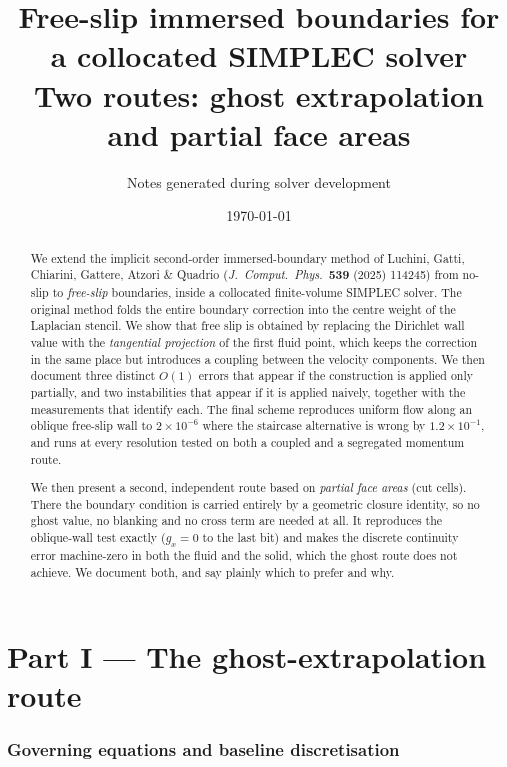 \documentclass[11pt,a4paper]{article}
\title{\bf Free-slip immersed boundaries for a collocated SIMPLEC solver\\
\large Two routes: ghost extrapolation and partial face areas}
\author{Notes generated during solver development}
\date{\today}
\begin{document}
\maketitle

\begin{abstract}
We extend the implicit second-order immersed-boundary method of Luchini, Gatti, Chiarini,
Gattere, Atzori \& Quadrio (\emph{J.\ Comput.\ Phys.}\ \textbf{539} (2025) 114245) from
no-slip to \emph{free-slip} boundaries, inside a collocated finite-volume SIMPLEC solver.
The original method folds the entire boundary correction into the centre weight of the
Laplacian stencil. We show that free slip is obtained by replacing the Dirichlet wall value
with the \emph{tangential projection} of the first fluid point, which keeps the correction in
the same place but introduces a coupling between the velocity components. We then document
three distinct $O(1)$ errors that appear if the construction is applied only partially, and
two instabilities that appear if it is applied naively, together with the measurements that
identify each. The final scheme reproduces uniform flow along an oblique free-slip wall to
$2\times10^{-6}$ where the staircase alternative is wrong by $1.2\times10^{-1}$, and runs at
every resolution tested on both a coupled and a segregated momentum route.

We then present a second, independent route based on \emph{partial face areas} (cut cells).
There the boundary condition is carried entirely by a geometric closure identity, so no ghost
value, no blanking and no cross term are needed at all. It reproduces the oblique-wall test
exactly ($g_x=0$ to the last bit) and makes the discrete continuity error machine-zero in both
the fluid and the solid, which the ghost route does not achieve. We document both, and say
plainly which to prefer and why.
\end{abstract}

\tableofcontents

\part*{Part I --- The ghost-extrapolation route}

\section{Governing equations and baseline discretisation}
\end{document}
